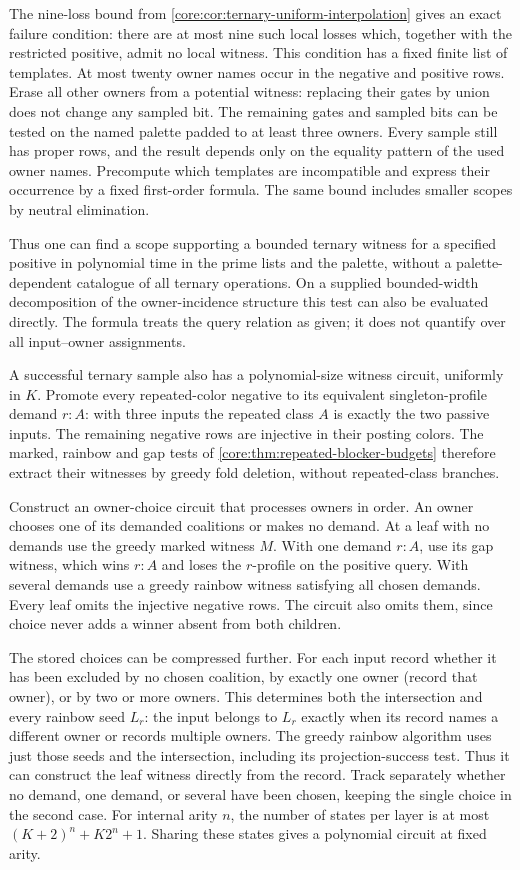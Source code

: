 The nine-loss bound from
\cref{core:cor:ternary-uniform-interpolation}
gives an exact failure condition:
there are at most nine such local losses
which, together with the restricted
positive, admit no local witness. This
condition has a fixed finite list of
templates. At most twenty owner names
occur in the negative and positive rows.
Erase all other owners from a potential
witness: replacing their gates by union
does not change any sampled bit. The
remaining gates and sampled bits can be
tested on the named palette padded to at
least three owners. Every sample still
has proper rows, and the result depends
only on the equality pattern of the used
owner names. Precompute which templates
are incompatible and express their
occurrence by a fixed first-order formula.
The same bound includes smaller scopes
by neutral elimination.

Thus one can find a scope supporting a
bounded ternary witness for a specified
positive in polynomial time in the prime lists and
the palette, without a palette-dependent
catalogue of all ternary operations.
On a supplied bounded-width decomposition
of the owner-incidence structure this
test can also be evaluated directly.
The formula treats the query relation as
given; it does not quantify over all
input--owner assignments.

A successful ternary sample also has a
polynomial-size witness circuit, uniformly in
$K$. Promote every repeated-color negative
to its equivalent singleton-profile demand
$r:A$: with three inputs the repeated class
$A$ is exactly the two passive inputs.
The remaining negative rows are injective
in their posting colors. The marked, rainbow
and gap tests of
\cref{core:thm:repeated-blocker-budgets}
therefore extract their witnesses by greedy
fold deletion, without repeated-class branches.

Construct an owner-choice circuit that
processes owners in order. An owner chooses
one of its demanded coalitions or makes no
demand. At a leaf with no demands use the
greedy marked witness $M$. With one demand
$r:A$, use its gap witness, which wins
$r:A$ and loses the $r$-profile on the
positive query. With several demands use a
greedy rainbow witness satisfying all chosen
demands. Every leaf omits the injective
negative rows. The circuit also omits them,
since choice never adds a winner absent
from both children.

The stored choices can be compressed further.
For each input record whether it has been
excluded by no chosen coalition, by exactly
one owner (record that owner), or by two or
more owners. This determines both the
intersection and every rainbow seed $L_r$:
the input belongs to $L_r$ exactly when its
record names a different owner or records
multiple owners. The greedy rainbow algorithm
uses just those seeds and the intersection,
including its projection-success test.
Thus it can construct the leaf witness
directly from the record. Track separately
whether no demand, one demand, or several
have been chosen, keeping the single choice
in the second case. For internal arity $n$,
the number of states per layer is at most
$(K+2)^n+K2^n+1$. Sharing these states gives
a polynomial circuit at fixed arity.

